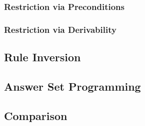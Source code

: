 \subsubsection{Restriction via Preconditions}\label{sec:restr_precond}

\subsubsection{Restriction via Derivability}\label{sec:restr_deriv}

\subsection{Rule Inversion}\label{sec:rule_inversion}


\subsection{Answer Set Programming}\label{sec:answer_set_programming}


\subsection{Comparison}\label{sec:comparison}






